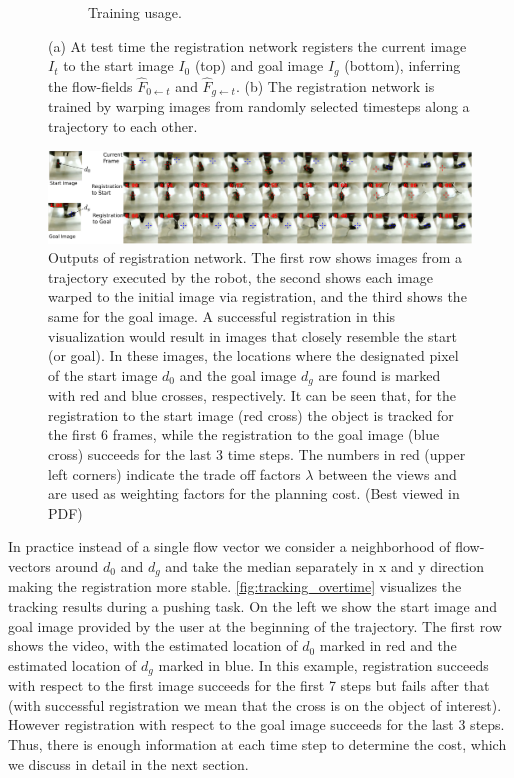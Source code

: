 \begin{figure}[t!]
\begin{subfigure}[b]{0.55\textwidth}
        \caption{\small{Training usage.}}
        \label{fig:discrete}
    \end{subfigure}
    \vspace{-1mm}
    \caption{\small{(a) At test time the registration network registers the current image $I_t$ to the start image $I_0$ (top) and goal image $I_g$ (bottom), inferring the flow-fields $\hat{F}_{0 \leftarrow t}$ and $\hat{F}_{g \leftarrow t}$. (b) The registration network is trained by warping images from randomly selected timesteps along a trajectory to each other.
    }}
    \label{fig:registration_arch}
\end{figure}

\begin{figure}
    \centering
    \vspace{-0.1in}
    \includegraphics[width=1\textwidth]{images/registration_overtime.pdf}
    \caption{\small{Outputs of registration network. The first row shows images from a trajectory executed by the robot, the second shows each image warped to the initial image via registration, and the third shows the same for the goal image. A successful registration in this visualization would result in images that closely resemble the start (or goal). In these images, the locations where the designated pixel of the start image $d_0$ and the goal image $d_g$ are found is marked with red and blue crosses, respectively. It can be seen that, for the registration to the start image (red cross) the object is tracked for the first 6 frames, while the registration to the goal image (blue cross) succeeds for the last 3 time steps. The numbers in red (upper left corners) indicate the trade off factors $\lambda$ between the views and are used as weighting factors for the planning cost. (Best viewed in PDF)}}
    \label{fig:tracking_overtime}
    \vspace{-0.2in}
\end{figure}

In practice instead of a single flow vector we consider a neighborhood of flow-vectors around $d_0$ and $d_g$ and take the median separately in x and y direction making the registration more stable.
\autoref{fig:tracking_overtime} visualizes the tracking results during a pushing task. On the left we show the start image and goal image provided by the user at the beginning of the trajectory. The first row shows the video, with the estimated location of $d_0$ marked in red and the estimated location of $d_g$ marked in blue. In this example, registration succeeds with respect to the first image succeeds for the first 7 steps but fails after that (with successful registration we mean that the cross is on the object of interest). However registration with respect to the goal image succeeds for the last 3 steps. Thus, there is enough information at each time step to determine the cost, which we discuss in detail in the next section.

